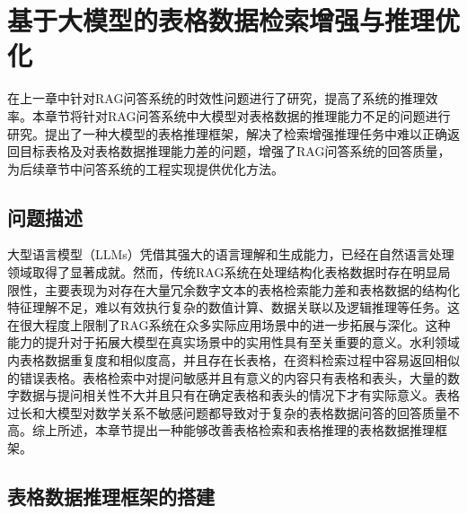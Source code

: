 \chapter{基于大模型的表格数据检索增强与推理优化}
\label{cha:第四章}
在上一章中针对RAG问答系统的时效性问题进行了研究，提高了系统的推理效率。本章节将针对RAG问答系统中大模型对表格数据的推理能力不足的问题进行研究。提出了一种大模型的表格推理框架，解决了检索增强推理任务中难以正确返回目标表格及对表格数据推理能力差的问题，增强了RAG问答系统的回答质量，为后续章节中问答系统的工程实现提供优化方法。
\section{问题描述}
大型语言模型（LLMs）凭借其强大的语言理解和生成能力，已经在自然语言处理领域取得了显著成就。然而，传统RAG系统在处理结构化表格数据时存在明显局限性，主要表现为对存在大量冗余数字文本的表格检索能力差和表格数据的结构化特征理解不足，难以有效执行复杂的数值计算、数据关联以及逻辑推理等任务。这在很大程度上限制了RAG系统在众多实际应用场景中的进一步拓展与深化。这种能力的提升对于拓展大模型在真实场景中的实用性具有至关重要的意义。水利领域内表格数据重复度和相似度高，并且存在长表格，在资料检索过程中容易返回相似的错误表格。表格检索中对提问敏感并且有意义的内容只有表格和表头，大量的数字数据与提问相关性不大并且只有在确定表格和表头的情况下才有实际意义。表格过长和大模型对数学关系不敏感问题都导致对于复杂的表格数据问答的回答质量不高。综上所述，本章节提出一种能够改善表格检索和表格推理的表格数据推理框架。

\section{表格数据推理框架的搭建}

